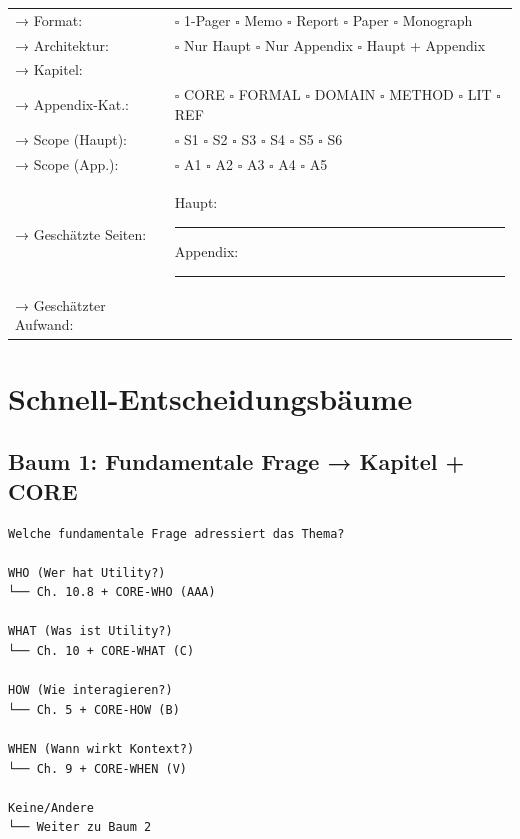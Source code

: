 \documentclass[12pt,a4paper]{article}
\begin{document}
\begin{tcolorbox}[colback=white, colframe=black, 
    title=\textbf{DOCUMENT SPECIFICATION CARD}]
\begin{tabular}{@{}p{4cm}p{9cm}@{}}
→ Format: & $\square$ 1-Pager $\square$ Memo $\square$ Report $\square$ Paper $\square$ Monograph \\[0.5em]
→ Architektur: & $\square$ Nur Haupt $\square$ Nur Appendix $\square$ Haupt + Appendix \\[0.5em]
→ Kapitel: & \hrulefill \\[0.5em]
→ Appendix-Kat.: & $\square$ CORE $\square$ FORMAL $\square$ DOMAIN $\square$ METHOD $\square$ LIT $\square$ REF \\[0.5em]
→ Scope (Haupt): & $\square$ S1 $\square$ S2 $\square$ S3 $\square$ S4 $\square$ S5 $\square$ S6 \\[0.5em]
→ Scope (App.): & $\square$ A1 $\square$ A2 $\square$ A3 $\square$ A4 $\square$ A5 \\[0.5em]
→ Geschätzte Seiten: & Haupt: \rule{2cm}{0.4pt} \hspace{1cm} Appendix: \rule{2cm}{0.4pt} \\[0.5em]
→ Geschätzter Aufwand: & \hrulefill \\
\end{tabular}

\end{tcolorbox}


\section{Schnell-Entscheidungsbäume}

\subsection{Baum 1: Fundamentale Frage → Kapitel + CORE}

\begin{verbatim}
Welche fundamentale Frage adressiert das Thema?

WHO (Wer hat Utility?)
└── Ch. 10.8 + CORE-WHO (AAA)

WHAT (Was ist Utility?)
└── Ch. 10 + CORE-WHAT (C)

HOW (Wie interagieren?)
└── Ch. 5 + CORE-HOW (B)

WHEN (Wann wirkt Kontext?)
└── Ch. 9 + CORE-WHEN (V)

Keine/Andere
└── Weiter zu Baum 2
\end{verbatim}
\end{document}
